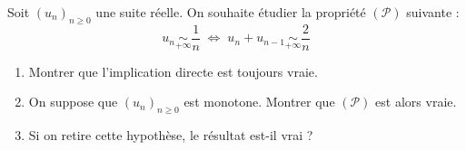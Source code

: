 \documentclass[a4paper,10pt]{report}
\begin{document}
\medskip


\begin{Exa}[\ding{80}] Soit $(u_n)_{n \geq 0}$ une suite réelle. On souhaite étudier la propriété $(\mathcal{P})$ suivante :
$$ u_n \underset{+ \infty}{\sim} \dfrac{1}{n} \; \Longleftrightarrow \; u_n + u_{n-1} \underset{+ \infty}{\sim} \dfrac{2}{n}$$
\begin{enumerate}
\item Montrer que l'implication directe est toujours vraie.
\item On suppose que $(u_n)_{n \geq 0}$ est monotone. Montrer que $(\mathcal{P})$ est alors vraie.
\item Si on retire cette hypothèse, le résultat est-il vrai ?
\end{enumerate}
\end{Exa}
\end{document}
